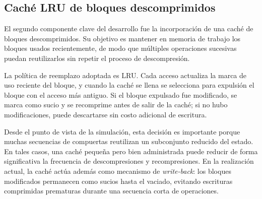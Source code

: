 \subsection{Caché LRU de bloques descomprimidos}

El segundo componente clave del desarrollo fue la incorporación de una caché de bloques descomprimidos. Su objetivo es mantener en memoria de trabajo
los bloques usados recientemente, de modo que múltiples operaciones sucesivas puedan reutilizarlos sin repetir el proceso de descompresión.

La política de reemplazo adoptada es LRU. Cada acceso actualiza la marca de uso reciente del bloque, y cuando la caché se llena se selecciona para
expulsión el bloque con el acceso más antiguo. Si el bloque expulsado fue modificado, se marca como sucio y se recomprime antes de salir de la caché;
si no hubo modificaciones, puede descartarse sin costo adicional de escritura.

Desde el punto de vista de la simulación, esta decisión es importante porque muchas secuencias de compuertas reutilizan un subconjunto reducido del
estado. En tales casos, una caché pequeña pero bien administrada puede reducir de forma significativa la frecuencia de descompresiones y recompresiones. En la realización actual, la caché actúa además como mecanismo de \emph{write-back}: los bloques modificados permanecen como sucios hasta el vaciado, evitando escrituras comprimidas prematuras durante una secuencia corta de operaciones.
